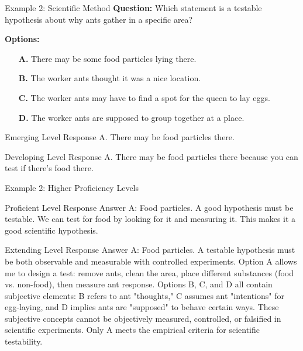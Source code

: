 \documentclass{beamer}
\begin{document}
\begin{frame}{Example 2: Scientific Method}
\textbf{Question:} Which statement is a testable hypothesis about why ants gather in a specific area?

\textbf{Options:}
\begin{itemize}
\item[\textbf{A.}] There may be some food particles lying there.
\item[\textbf{B.}] The worker ants thought it was a nice location.
\item[\textbf{C.}] The worker ants may have to find a spot for the queen to lay eggs.
\item[\textbf{D.}] The worker ants are supposed to group together at a place.
\end{itemize}

\pause
\begin{block}{Emerging Level Response}
A. There may be food particles there.
\end{block}

\pause
\begin{block}{Developing Level Response}
A. There may be food particles there because you can test if there's food there.
\end{block}
\end{frame}

\begin{frame}{Example 2: Higher Proficiency Levels}
\begin{block}{Proficient Level Response}
Answer A: Food particles. A good hypothesis must be testable. We can test for food by looking for it and measuring it. This makes it a good scientific hypothesis.
\end{block}

\pause
\begin{block}{Extending Level Response}  
Answer A: Food particles. A testable hypothesis must be both observable and measurable with controlled experiments. Option A allows me to design a test: remove ants, clean the area, place different substances (food vs. non-food), then measure ant response. Options B, C, and D all contain subjective elements: B refers to ant "thoughts," C assumes ant "intentions" for egg-laying, and D implies ants are "supposed" to behave certain ways. These subjective concepts cannot be objectively measured, controlled, or falsified in scientific experiments. Only A meets the empirical criteria for scientific testability.
\end{block}
\end{frame}
\end{document}
